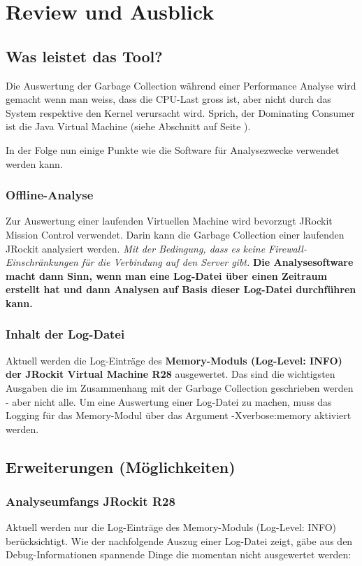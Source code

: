 \chapter{Review und Ausblick}\label{review}
\section{Was leistet das Tool?}
Die Auswertung der Garbage Collection während einer Performance Analyse wird gemacht wenn man weiss, dass die CPU-Last gross ist, aber nicht durch das System respektive den Kernel verursacht wird. Sprich, der Dominating Consumer ist die Java Virtual Machine (siehe Abschnitt  auf Seite \pageref{dominating_consumer}).

In der Folge nun einige Punkte wie die Software für Analysezwecke verwendet werden kann.

\subsection{Offline-Analyse}
Zur Auswertung einer laufenden Virtuellen Machine wird bevorzugt JRockit Mission Control verwendet. Darin kann die Garbage Collection einer laufenden JRockit analysiert werden. \textit{Mit der Bedingung, dass es keine Firewall-Einschränkungen für die Verbindung auf den Server gibt.} \textbf{Die Analysesoftware macht dann Sinn, wenn man eine Log-Datei über einen Zeitraum erstellt hat und dann Analysen auf Basis dieser Log-Datei durchführen kann.}

\subsection{Inhalt der Log-Datei}
Aktuell werden die Log-Einträge des \textbf{Memory-Moduls  (Log-Level: INFO) der JRockit Virtual Machine R28} ausgewertet. Das sind die wichtigsten Ausgaben die im Zusammenhang mit der Garbage Collection geschrieben werden - aber nicht alle. Um eine Auswertung einer Log-Datei zu machen, muss das Logging für das Memory-Modul über das Argument -Xverbose:memory aktiviert werden.

\section{Erweiterungen (Möglichkeiten)}
\subsection{Analyseumfangs JRockit R28}\label{analyseumfang_jr28}
Aktuell werden nur die Log-Einträge des Memory-Moduls (Log-Level: INFO) berücksichtigt. Wie der nachfolgende Auszug einer Log-Datei zeigt, gäbe aus den Debug-Informationen spannende Dinge die momentan nicht ausgewertet werden:

